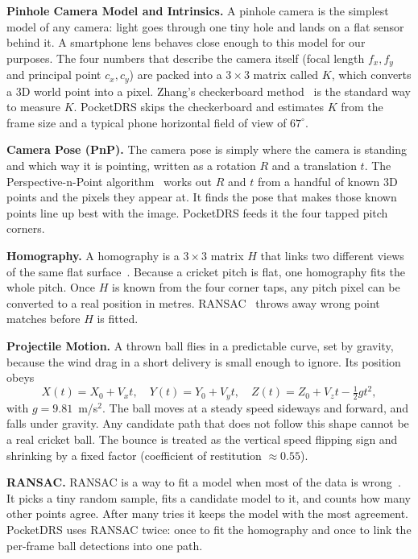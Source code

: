 \documentclass[12pt,a4paper]{report}
\begin{document}
\textbf{Pinhole Camera Model and Intrinsics.} A pinhole camera is the simplest model of any camera: light goes through one tiny hole and lands on a flat sensor behind it. A smartphone lens behaves close enough to this model for our purposes. The four numbers that describe the camera itself (focal length $f_x, f_y$ and principal point $c_x, c_y$) are packed into a $3\times3$ matrix called $K$, which converts a 3D world point into a pixel. Zhang's checkerboard method~\cite{zhang2000} is the standard way to measure $K$. PocketDRS skips the checkerboard and estimates $K$ from the frame size and a typical phone horizontal field of view of $67^{\circ}$.

\textbf{Camera Pose (PnP).} The camera pose is simply where the camera is standing and which way it is pointing, written as a rotation $R$ and a translation $t$. The Perspective-n-Point algorithm~\cite{bradski2008} works out $R$ and $t$ from a handful of known 3D points and the pixels they appear at. It finds the pose that makes those known points line up best with the image. PocketDRS feeds it the four tapped pitch corners.

\textbf{Homography.} A homography is a $3\times3$ matrix $H$ that links two different views of the same flat surface~\cite{hartley2004}. Because a cricket pitch is flat, one homography fits the whole pitch. Once $H$ is known from the four corner taps, any pitch pixel can be converted to a real position in metres. RANSAC~\cite{fischler1981} throws away wrong point matches before $H$ is fitted.

\textbf{Projectile Motion.} A thrown ball flies in a predictable curve, set by gravity, because the wind drag in a short delivery is small enough to ignore. Its position obeys
\[
X(t) = X_0 + V_x t,\quad Y(t) = Y_0 + V_y t,\quad Z(t) = Z_0 + V_z t - \tfrac{1}{2} g t^2,
\]
with $g = 9.81$~m/s$^2$. The ball moves at a steady speed sideways and forward, and falls under gravity. Any candidate path that does not follow this shape cannot be a real cricket ball. The bounce is treated as the vertical speed flipping sign and shrinking by a fixed factor (coefficient of restitution $\approx 0.55$).

\textbf{RANSAC.} RANSAC is a way to fit a model when most of the data is wrong~\cite{fischler1981}. It picks a tiny random sample, fits a candidate model to it, and counts how many other points agree. After many tries it keeps the model with the most agreement. PocketDRS uses RANSAC twice: once to fit the homography and once to link the per-frame ball detections into one path.
\end{document}

